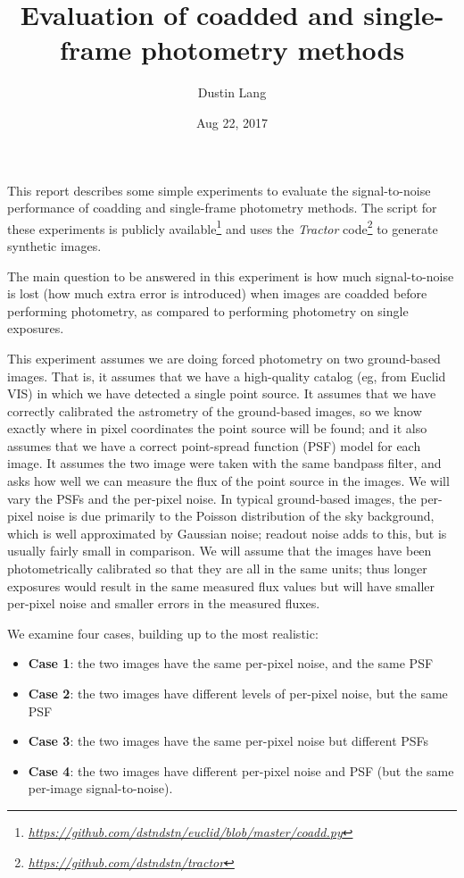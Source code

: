 \documentclass[letter,11pt]{article}
\author{Dustin Lang}
\date{Aug 22, 2017}
\title{Evaluation of coadded and single-frame photometry methods}
\newcommand{\niceurl}[1]{\href{#1}{\textsl{#1}}}
\newcommand{\code}[1]{\textsl{#1}}
\begin{document}
\maketitle

This report describes some simple experiments to evaluate the
signal-to-noise performance of coadding and single-frame photometry
methods.  The script for these experiments is publicly
available\footnote{%
  \niceurl{https://github.com/dstndstn/euclid/blob/master/coadd.py}}
and uses the \code{Tractor} code\footnote{%
  \niceurl{https://github.com/dstndstn/tractor}} to generate synthetic images.

The main question to be answered in this experiment is how much
signal-to-noise is lost (how much extra error is introduced) when
images are coadded before performing photometry, as compared to
performing photometry on single exposures.

This experiment assumes we are doing forced photometry on two
ground-based images.  That is, it assumes that we have a high-quality
catalog (eg, from Euclid VIS) in which we have detected a single point
source.  It assumes that we have correctly calibrated the astrometry
of the ground-based images, so we know exactly where in pixel
coordinates the point source will be found; and it also assumes that
we have a correct point-spread function (PSF) model for each image.
It assumes the two image were taken with the same bandpass filter, and
asks how well we can measure the flux of the point source in the
images.  We will vary the PSFs and the per-pixel noise.  In typical
ground-based images, the per-pixel noise is due primarily to the
Poisson distribution of the sky background, which is well approximated
by Gaussian noise; readout noise adds to this, but is usually fairly
small in comparison.  We will assume that the images have been
photometrically calibrated so that they are all in the same units;
thus longer exposures would result in the same measured flux values
but will have smaller per-pixel noise and smaller errors in the
measured fluxes.

We examine four cases, building up to the most realistic:
\begin{itemize}
\item \textbf{Case 1}: the two images have the same per-pixel noise,
  and the same PSF
\item \textbf{Case 2}: the two images have different levels of
  per-pixel noise, but the same PSF
\item \textbf{Case 3}: the two images have the same per-pixel noise
  but different PSFs
\item \textbf{Case 4}: the two images have different per-pixel noise
  and PSF (but the same per-image signal-to-noise).
\end{itemize}
\end{document}
